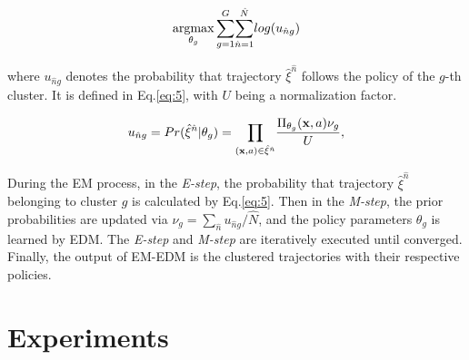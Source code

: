 \documentclass{article}
\DeclareMathOperator*{\argmax}{argmax}
\begin{document}




\begin{equation}
\small
\label{eq:10}
    \argmax_{\theta_g} \underset{g=1}{\overset{G}{\sum}} \underset{\hat{n}=1}{\overset{\hat{N}}{\sum}} log(u_{\hat{n}g})
\end{equation}

\noindent where $u_{\hat{n}g}$ denotes the probability that trajectory $\hat{\xi}^{\hat{n}}$ follows the policy of the $g$-th cluster. It is defined in Eq.\eqref{eq:5}, with $U$ being a normalization factor.

\begin{equation}
\small
\label{eq:5}
     u_{\hat{n}g} = Pr(\hat{\xi}^{\hat{n}}|\theta_{g}) = \underset{(\mathbf{x},a) \in \hat{\xi}^{\hat{n}}}{\prod} \frac{\Pi_{\theta_{g}}(\mathbf{x},a)\nu_{g}}{U},
\end{equation}


During the EM process, in the \textit{E-step}, the probability that trajectory $\hat{\xi}^{\hat{n}}$ belonging to cluster $g$ is calculated by Eq.\eqref{eq:5}. 
Then in the \textit{M-step}, the prior probabilities are updated via $\nu_{g} = \sum_{\hat{n}} u_{\hat{n}g}/\hat{N}$, and the policy parameters $\theta_{g}$ is learned by EDM. 
The \textit{E-step} and \textit{M-step} are iteratively executed until converged. Finally, the output of EM-EDM is the clustered trajectories with their respective policies.





\section{Experiments}
\end{document}
